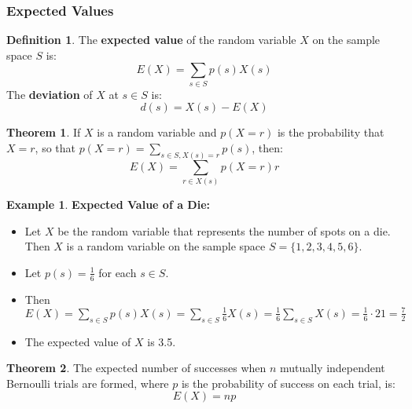 \documentclass[article, 11pt]{article}
\theoremstyle{definition}
\newtheorem{example}{Example}[subsubsection]
\newtheorem{theorem}{Theorem}[subsubsection]
\newtheorem{definition}{Definition}[subsubsection]
\newcommand{\df}{\displaystyle\frac} %
\begin{document}
    \subsubsection{Expected Values}
    \begin{definition}
        The \textbf{expected value} of the random variable $X$ on the sample space $S$ is:
        \begin{equation*}
            E(X) = \sum_{s \in S} p(s)X(s)
        \end{equation*}
        The \textbf{deviation} of $X$ at $s \in S$ is: 
        \begin{equation*}
            d(s) = X(s) - E(X)
        \end{equation*}
    \end{definition} 
    \begin{theorem}
        If $X$ is a random variable and $p(X=r)$ is the probability that $X=r$, so that $p(X=r) = \displaystyle\sum_{s \in S, X(s)=r} p(s)$, then:
        \begin{equation*}
            E(X) = \sum_{r \in X(s)} p(X=r)r
        \end{equation*}
    \end{theorem}
    \begin{example}
        \textbf{Expected Value of a Die: }
        \begin{itemize}
            \item Let $X$ be the random variable that represents the number of spots on a die. Then $X$ is a random variable on the sample space $S = \{1,2,3,4,5,6\}$.
            \item Let $\displaystyle p(s) = \frac{1}{6}$ for each $s \in S$.
            \item Then $\displaystyle E(X) = \sum_{s \in S} p(s)X(s) = \sum_{s \in S} \frac{1}{6}X(s) = \frac{1}{6}\sum_{s \in S} X(s) = \frac{1}{6}\cdot 21 = \df{7}{2}$
            \item The expected value of $X$ is 3.5.
        \end{itemize}
        \label{ex:ev-die}
    \end{example} 
    \begin{theorem}
        The expected number of successes when $n$ mutually independent Bernoulli trials are formed, where $p$ is the probability of success on each trial, is:
        \begin{equation*}
            E(X) = np
        \end{equation*}
    \end{theorem}
\end{document}
